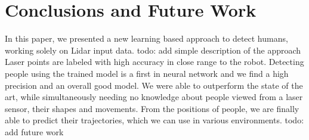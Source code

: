 \section{Conclusions and Future Work}

\label{sec:Conclusion}

In this paper, we presented a new learning based approach to detect humans, working solely on Lidar input data. todo: add simple description of the approach
Laser points are labeled with high accuracy in close range to the robot. Detecting people using the trained model is a first in neural network and we find a high precision and an overall good model. We were able to outperform the state of the art, while simultaneously needing no knowledge about people viewed from a laser sensor, their shapes and movements. From the positions of people, we are finally able to predict their trajectories, which we can use in various environments.
todo: add future work

